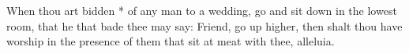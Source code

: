 When thou art bidden * of any man to a wedding, go and sit down in the lowest room, that he that bade thee may say: Friend, go up higher, then shalt thou have worship in the presence of them that sit at meat with thee, alleluia.